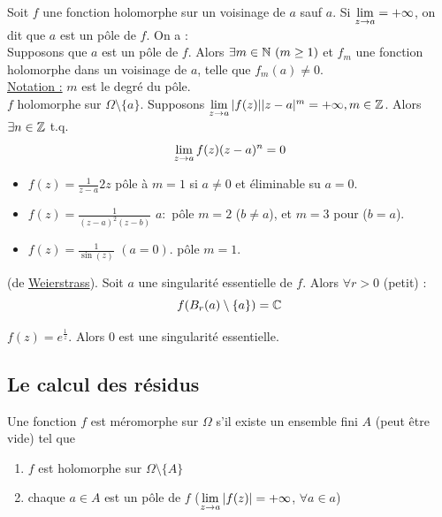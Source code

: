 \documentclass[12pt,a4paper]{article}
\begin{document}
 Soit $f$ une fonction holomorphe sur un voisinage de $a$ sauf $a$. Si $\lim\limits_{z\to a} = +\infty$, on dit que $a$ est un pôle de $f$. On a :\\
 Supposons que $a$ est un pôle de $f$. Alors $\exists m \in \mathbb{N}\ (m \geq 1)$ et $f_m$ une fonction holomorphe dans un voisinage de $a$, telle que $f_m(a) \neq 0$.\\
\uline{Notation :} $m$ est le degré du pôle.\\
 $f$ holomorphe sur $\Omega\setminus\{a\}$. Supposons $\lim\limits_{z\to a}|f(z)||z-a|^m = + \infty, m \in \mathbb{Z}$. Alors $\exists n \in \mathbb{Z}$ t.q.
\[\lim\limits_{z\to a} f(z)(z-a)^n = 0\]

\begin{exemple}
    \begin{itemize}
        \item $f(z) = \frac{1}{z-a}2z$ pôle à $m = 1$ si $a \neq 0$ et éliminable su $a=0$.
        \item $f(z) = \frac{1}{(z-a)^2(z-b)}$ $a:$ pôle $m=2$ ($b \neq a$), et $m=3$ pour ($b=a$).
        \item $f(z) = \frac{1}{\sin(z)}$ $(a = 0)$. pôle $m=1$.
\end{itemize}
\end{exemple}
 (de \uline{Weierstrass}). Soit $a$ une singularité essentielle de $f$. Alors $\forall r > 0$ (petit) :
\[f(B_r(a) \setminus \{a\}) = \mathbb{C}\]
\begin{exemple}
    $f(z) = e^{\frac{1}{z}}$. Alors $0$ est une singularité essentielle.
\end{exemple}

\subsection{Le calcul des résidus}
 Une fonction $f$ est méromorphe sur $\Omega$ s'il existe un ensemble fini $A$ (peut être vide) tel que 
\begin{enumerate}
    \item $f$ est holomorphe sur $\Omega \setminus\{A\}$
    \item chaque $a \in A$ est un pôle de $f$ ($\lim\limits_{z\to a}|f(z)| = +\infty$, 
    $\forall a \in a$)
\end{enumerate}
\end{document}
